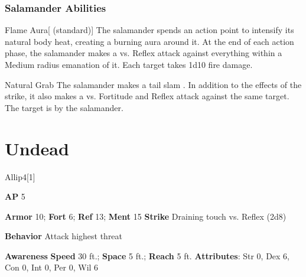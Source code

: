 \subsubsection{Salamander Abilities}

\begin{ability}{Flame Aura}[ (standard)]
The salamander spends an action point to intensify its natural body heat, creating a burning aura around it.
At the end of each action phase, the salamander makes a  vs. Reflex
attack against everything within a Medium radius emanation of it.
\hit Each target takes 1d10 fire damage.
\end{ability}

\vspace{0.5em}
\begin{ability}{Natural Grab}
The salamander makes a tail slam .
In addition to the effects of the strike, it also makes a  vs. Fortitude and Reflex attack against the same target.
\hit The target is  by the salamander.
\end{ability}

\section{Undead}
\begin{monsection}{Allip}{4}[1]
\vspace{-1em}\vspace{-1em}
\begin{spellcontent}
\begin{spelltargetinginfo}
{\textbf{AP} 5}

\pari \textbf{Armor} 10;
\textbf{Fort} 6;
\textbf{Ref} 13;
\textbf{Ment} 15
\pari \textbf{Strike} Draining touch  vs. Reflex (2d8)



\pari \textbf{Behavior} Attack highest threat
\end{spelltargetinginfo}
\end{spellcontent}

\begin{monsterfooter}
\pari \textbf{Awareness} 
\pari \textbf{Speed} 30 ft.;
\textbf{Space} 5 ft.;
\textbf{Reach} 5 ft.
\pari \textbf{Attributes}:
Str 0,
Dex 6,
Con 0,
Int 0,
Per 0,
Wil 6
\end{monsterfooter}
\end{monsection}

